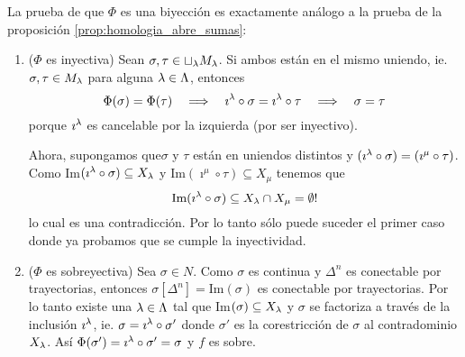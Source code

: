 	La prueba de que $\Phi$ es una biyecci\'on es exactamente an\'alogo a la prueba de la proposici\'on \ref{prop:homologia_abre_sumas}:
\begin{enumerate}
	\item ($\Phi$ es inyectiva) Sean $\sigma,\tau\in\sqcup_{\lambda} M_{\lambda}$. Si ambos est\'an en el mismo uniendo,
			ie. $\sigma,\tau\in M_{\lambda}$ para alguna $\lambda\in\Lambda$, entonces
			\[
				\Phi(\sigma)=\Phi(\tau) \quad\Longrightarrow\quad \imath^{\lambda}\circ \sigma=\imath^{\lambda}\circ \tau \quad\Longrightarrow\quad \sigma=\tau
			\]
			porque $\imath^{\lambda}$ es cancelable por la izquierda (por ser inyectivo).

			Ahora, supongamos que$\sigma$ y $\tau$ est\'an en uniendos distintos y $(\imath^{\lambda}\circ\sigma)=(\imath^{\mu}\circ\tau)$.
			Como Im$(\imath^{\lambda}\circ\sigma)\subseteq X_{\lambda}$ y Im$(\imath^{\mu}\circ\tau)\subseteq X_{\mu}$ tenemos que
			\[
					\text{Im}(\imath^{\lambda}\circ\sigma)\subseteq X_{\lambda}\cap X_{\mu}=\emptyset !
			\]
			lo cual es una contradicci\'on. Por lo tanto s\'olo puede suceder el primer caso donde ya probamos que se cumple
			la inyectividad.

	\item ($\Phi$ es sobreyectiva) Sea $\sigma\in N$. Como $\sigma$ es continua y $\Delta^n$ es conectable por trayectorias,
			entonces $\sigma[\Delta^n]=$Im$(\sigma)$ es conectable por trayectorias. Por lo tanto existe una $\lambda\in\Lambda$ tal que
			Im$(\sigma)\subseteq X_{\lambda}$ y $\sigma$ se factoriza a trav\'es de la inclusi\'on $\imath^{\lambda}$, ie. $\sigma=\imath^{\lambda}\circ\sigma'$
			donde $\sigma'$ es la corestricci\'on de $\sigma$ al contradominio $X_{\lambda}$. As\'i $\Phi(\sigma')=\imath^{\lambda}\circ\sigma'=\sigma$
			y $f$ es sobre.
\end{enumerate}

